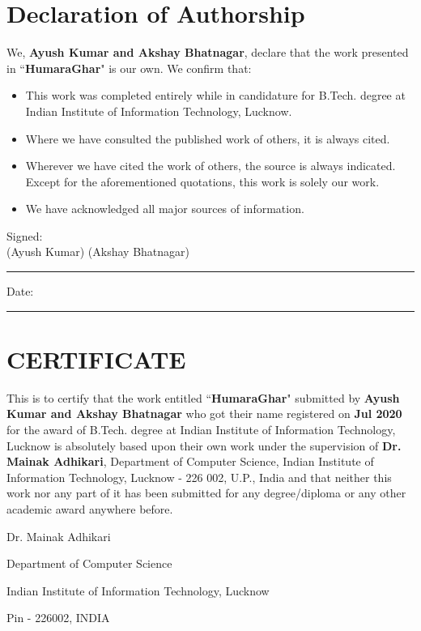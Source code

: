 \thispagestyle{empty}

\setcounter{page}{3}

\chapter*{Declaration of Authorship}

\vspace{1cm}

\noindent
We, \textbf{Ayush Kumar and Akshay Bhatnagar}, declare that the work presented in ``\textbf{HumaraGhar}" is our own. We confirm that:

\medskip

\begin{itemize}
      \item This work was completed entirely while in candidature for B.Tech. degree at Indian Institute of Information Technology, Lucknow.

            \medskip

      \item Where we have consulted the published work of others, it is always cited.

            \medskip

      \item Wherever we have cited the work of others, the source is always indicated. Except for the aforementioned quotations, this work is solely our work.

            \medskip

      \item We have acknowledged all major sources of information.
\end{itemize}

\vspace{2cm}

\noindent Signed:\\

\hspace{1.5cm}(Ayush Kumar) \hfill (Akshay Bhatnagar)
\rule[0.5em]{33em}{0.5pt}

\noindent Date:\\
\rule[0.5em]{33em}{0.5pt}

\cleardoublepage

\chapter*{CERTIFICATE}

This is to certify that the work entitled ``\textbf{HumaraGhar}" submitted by \textbf{Ayush Kumar and Akshay Bhatnagar} who got their name registered on \textbf{\;\;\; Jul 2020} for the award of B.Tech. degree at Indian Institute of Information Technology, Lucknow is absolutely based upon their own work under the supervision of \textbf{Dr. Mainak Adhikari}, Department of Computer Science, Indian Institute of Information Technology, Lucknow - 226 002, U.P., India and that neither this work nor any part of it has been submitted for any degree/diploma or any other academic award anywhere before.

\vspace{4cm}

\begin{center}
      Dr. Mainak Adhikari

      Department of Computer Science

      Indian Institute of Information Technology, Lucknow

      Pin - 226002, INDIA
\end{center}
